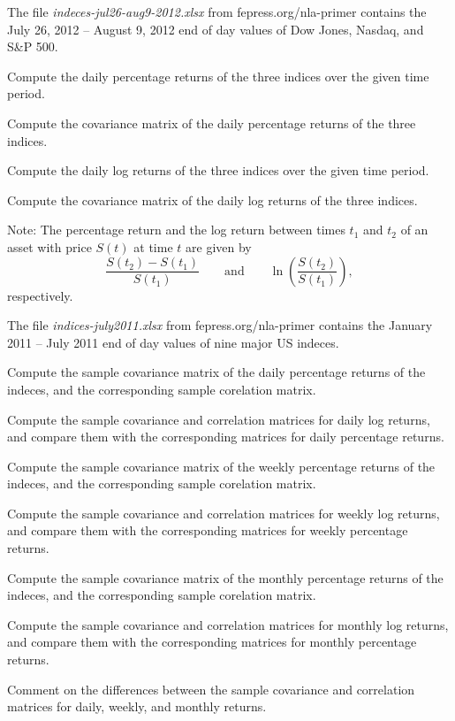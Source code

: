 \begin{exercises}
\item The file \textit{indeces-jul26-aug9-2012.xlsx} from
fepress.org/nla-primer contains the July 26, 2012 -- August 9, 2012 end of
day values of Dow Jones, Nasdaq, and S\&P 500.
\begin{subparts}
\item Compute the daily percentage returns of the three indices over the
given time period.
\item Compute the covariance matrix of the daily percentage returns of the
three indices.
\item Compute the daily log returns of the three indices over the given
time period.
\item Compute the covariance matrix of the daily log returns of the three
indices.
\end{subparts}

\noindent Note: The percentage return and the log return between
times $t_1$ and $t_2$ of an asset with price $S(t)$ at time $t$ are given
by
\[
\frac{S(t_2)-S(t_1)}{S(t_1)} \qquad \text{and} \qquad
\ln\!\left(\frac{S(t_2)}{S(t_1)}\right),
\]
respectively.

\item The file \textit{indices-july2011.xlsx} from fepress.org/nla-primer
contains the January 2011 -- July 2011 end of day values of nine major US
indeces.
\begin{subparts}
\item Compute the sample covariance matrix of the daily percentage
returns of the indeces, and the corresponding sample corelation matrix.

Compute the sample covariance and correlation matrices for daily log
returns, and compare them with the corresponding matrices for daily
percentage returns.
\item Compute the sample covariance matrix of the weekly percentage
returns of the indeces, and the corresponding sample corelation matrix.

Compute the sample covariance and correlation matrices for weekly log
returns, and compare them with the corresponding matrices for weekly
percentage returns.
\item Compute the sample covariance matrix of the monthly percentage
returns of the indeces, and the corresponding sample corelation matrix.

Compute the sample covariance and correlation matrices for monthly log
returns, and compare them with the corresponding matrices for monthly
percentage returns.
\item Comment on the differences between the sample covariance and
correlation matrices for daily, weekly, and monthly returns.
\end{subparts}


\end{exercises}
